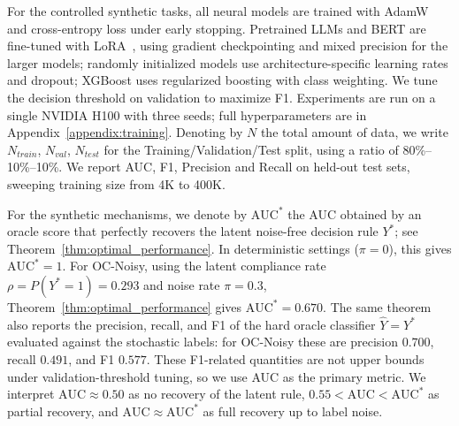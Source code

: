 \documentclass{article} %
\theoremstyle{plain}
\theoremstyle{definition}
\theoremstyle{remark}
\begin{document}
For the controlled synthetic tasks, all neural models are trained with AdamW~\citep{AdamW} and cross-entropy loss under early stopping. Pretrained LLMs and BERT are fine-tuned with LoRA~\citep{LoRA}, using gradient checkpointing and mixed precision for the larger models; randomly initialized models use architecture-specific learning rates and dropout; XGBoost uses regularized boosting with class weighting. We tune the decision threshold on validation to maximize F1. Experiments are run on a single NVIDIA H100 with three seeds; full hyperparameters are in Appendix~\ref{appendix:training}. Denoting by $N$ the total amount of data, we write $N_{train}$, $N_{val}$, $N_{test}$ for the Training/Validation/Test split, using a ratio of 80\%--10\%--10\%. We report AUC, F1, Precision and Recall on held-out test sets, sweeping training size from 4K to 400K.

For the synthetic mechanisms, we denote by $\mathrm{AUC}^*$ the AUC obtained by an oracle score that perfectly recovers the latent noise-free decision rule $Y^*$; see Theorem~\ref{thm:optimal_performance}. In deterministic settings ($\pi=0$), this gives $\mathrm{AUC}^*=1$. For OC-Noisy, using the latent compliance rate $\rho = P(Y^*=1)=0.293$ and noise rate $\pi=0.3$, Theorem~\ref{thm:optimal_performance} gives $\mathrm{AUC}^*=0.670$. The same theorem also reports the precision, recall, and F1 of the hard oracle classifier $\hat Y=Y^*$ evaluated against the stochastic labels: for OC-Noisy these are precision $0.700$, recall $0.491$, and F1 $0.577$. These F1-related quantities are not upper bounds under validation-threshold tuning, so we use AUC as the primary metric. We interpret $\mathrm{AUC}\approx 0.50$ as no recovery of the latent rule, $0.55<\mathrm{AUC}<\mathrm{AUC}^*$ as partial recovery, and
$\mathrm{AUC}\approx\mathrm{AUC}^*$ as full recovery up to label noise.
\end{document}
